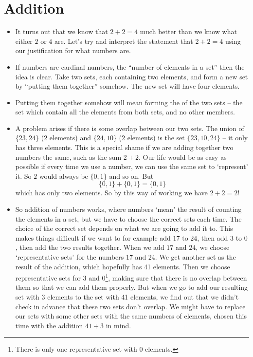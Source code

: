 \chapter{Addition}
\label{addition}

\begin{itemize}
\item
It turns out that we know that $2 + 2 = 4$ much better than we know what either $2$ or $4$ are. Let's try and interpret the statement that $2 + 2 = 4$ using our justification for what numbers are.
\item
If numbers are cardinal numbers, the ``number of elements in a set'' then the idea is clear. Take two sets, each containing two elements, and form a new set by ``putting them together'' somehow. The new set will have four elements.
\item
Putting them together somehow will mean forming the  of the two sets -- the set which contain all the elements from both sets, and no other members. 
\item
A problem arises if there is some overlap between our two sets. The union of $\{23, 24\}$ (2 elements) and $\{24, 10\}$ (2 elements) is the set $\{23, 10, 24\}$ -- it only has three elements.
This is a special shame if we are adding together two numbers the same, such as the sum $2 + 2$. Our life would be as easy as possible if every time we use a number, we can use the same set to `represent' it. So $2$ would always be $\{0,1\}$ and so on. But 
\[ \{0,1\} + \{0,1\} = \{0,1\} \]
which has only two elements. So by this way of working we have $2 + 2 = 2$!
\item
So addition of numbers works, where numbers `mean' the result of counting the elements in a set, but we have to choose the correct sets each time. The choice of the correct set depends on what we are going to add it to. This makes things difficult if we want to for example add $17$ to $24$, then add $3$ to $0$, then add the two results together. When we add $17$ and $24$, we choose `representative sets' for the numbers 17 and 24. We get another set as the result of the addition, which hopefully has 41 elements. Then we choose representative sets for 3 and 0\footnote{There is only one representative set with $0$ elements.}, making sure that there is no overlap between them so that we can add them properly. But when we go to add our resulting set with 3 elements to the set with 41 elements, we find out that we didn't check in advance that these two sets don't overlap. We might have to replace our sets with some other sets with the same numbers of elements, chosen this time with the addition $41 + 3$ in mind.

\end{itemize}
